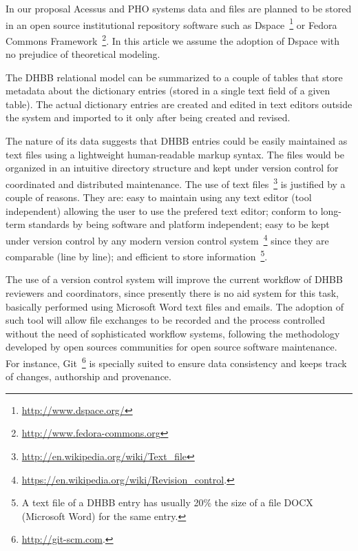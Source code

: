 In our proposal Acessus and PHO systems data and files are planned to be stored in an open
source institutional repository software such as
Dspace~\footnote{\url{http://www.dspace.org/}} or Fedora Commons
Framework~\footnote{\url{http://www.fedora-commons.org}}.
In this article we assume the adoption of Dspace with no prejudice of
theoretical modeling. 


The DHBB relational model can be summarized to a couple of
tables that store metadata about the dictionary entries (stored in a
single text field of a given table). The actual dictionary entries are
created and edited in text editors outside the system and imported to
it only after being created and revised. 


The nature of its data suggests that DHBB entries could be easily
maintained as text files using a lightweight human-readable markup
syntax. The files would be organized in an intuitive directory
structure and kept under version control for coordinated and
distributed maintenance. The use of text
files~\footnote{\url{http://en.wikipedia.org/wiki/Text_file}} is justified
by a couple of reasons. They are: easy to maintain using any text editor
(tool independent) allowing the user to use the prefered text editor; 
conform to long-term standards by being software and platform
independent; easy to be kept under version control by any modern
version control
system~\footnote{\url{https://en.wikipedia.org/wiki/Revision_control}.}
since they are comparable (line by line); and efficient to store
information~\footnote{A text file of a DHBB entry has usually 20\% the
size of a file DOCX (Microsoft Word) for the same entry.}.

The use of a version control system will improve the
current workflow of DHBB reviewers and coordinators, since presently
there is no aid system for this task, basically performed using
Microsoft Word text files and emails. The adoption of such tool
will allow file exchanges to be recorded and the process controlled 
without the need of sophisticated workflow systems,
following the methodology developed by open sources communities for
open source software maintenance. For instance,
Git~\footnote{\url{http://git-scm.com}.} is specially suited to
ensure data consistency and keeps track of changes, authorship and
provenance. 

